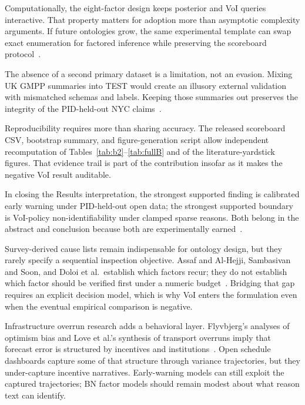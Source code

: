 Computationally, the eight-factor design keeps posterior and VoI queries interactive. That property matters for adoption more than asymptotic complexity arguments. If future ontologies grow, the same experimental template can swap exact enumeration for factored inference while preserving the scoreboard protocol~\cite{Heckerman1996,Onisko2001}.

The absence of a second primary dataset is a limitation, not an evasion. Mixing UK GMPP summaries into TEST would create an illusory external validation with mismatched schemas and labels. Keeping those summaries out preserves the integrity of the PID-held-out NYC claims~\cite{Woldesenbet2016,Tagharobi2025}.

Reproducibility requires more than sharing accuracy. The released scoreboard CSV, bootstrap summary, and figure-generation script allow independent recomputation of Tables~\ref{tab:b2}--\ref{tab:fullB} and of the literature-yardstick figures. That evidence trail is part of the contribution insofar as it makes the negative VoI result auditable.

In closing the Results interpretation, the strongest supported finding is calibrated early warning under PID-held-out open data; the strongest supported boundary is VoI-policy non-identifiability under clamped sparse reasons. Both belong in the abstract and conclusion because both are experimentally earned~\cite{Egwim2021,Memarzadeh2016,Gneiting2007}.

Survey-derived cause lists remain indispensable for ontology design, but they rarely specify a sequential inspection objective. Assaf and Al-Hejji, Sambasivan and Soon, and Doloi et al.\ establish which factors recur; they do not establish which factor should be verified first under a numeric budget~\cite{Assaf2006,Sambasivan2007,Doloi2012}. Bridging that gap requires an explicit decision model, which is why VoI enters the formulation even when the eventual empirical comparison is negative.

Infrastructure overrun research adds a behavioral layer. Flyvbjerg's analyses of optimism bias and Love et al.'s synthesis of transport overruns imply that forecast error is structured by incentives and institutions~\cite{Flyvbjerg2009,Love2015}. Open schedule dashboards capture some of that structure through variance trajectories, but they under-capture incentive narratives. Early-warning models can still exploit the captured trajectories; BN factor models should remain modest about what reason text can identify.

